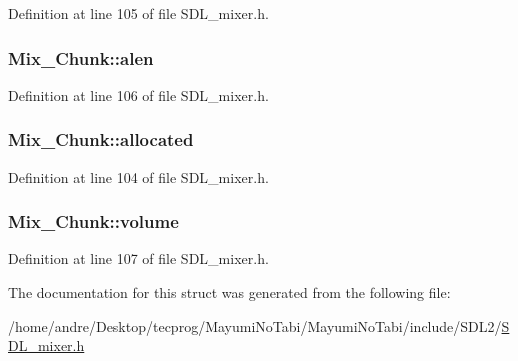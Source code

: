 Definition at line 105 of file S\-D\-L\-\_\-mixer.\-h.

\hypertarget{struct_mix___chunk_a958507964471fc4b9fa0d215f1852d05}{
\subsubsection[{alen}]{ Mix\-\_\-\-Chunk\-::alen}}\label{struct_mix___chunk_a958507964471fc4b9fa0d215f1852d05}


Definition at line 106 of file S\-D\-L\-\_\-mixer.\-h.

\hypertarget{struct_mix___chunk_a7b985b90b5f97fffe34834116a281615}{
\subsubsection[{allocated}]{ Mix\-\_\-\-Chunk\-::allocated}}\label{struct_mix___chunk_a7b985b90b5f97fffe34834116a281615}


Definition at line 104 of file S\-D\-L\-\_\-mixer.\-h.

\hypertarget{struct_mix___chunk_afc566fd5da7f0ed1f3577f5bc0eac319}{
\subsubsection[{volume}]{ Mix\-\_\-\-Chunk\-::volume}}\label{struct_mix___chunk_afc566fd5da7f0ed1f3577f5bc0eac319}


Definition at line 107 of file S\-D\-L\-\_\-mixer.\-h.



The documentation for this struct was generated from the following file\-:\begin{DoxyCompactItemize}
\item 
/home/andre/\-Desktop/tecprog/\-Mayumi\-No\-Tabi/\-Mayumi\-No\-Tabi/include/\-S\-D\-L2/\hyperlink{_s_d_l__mixer_8h}{S\-D\-L\-\_\-mixer.\-h}\end{DoxyCompactItemize}
